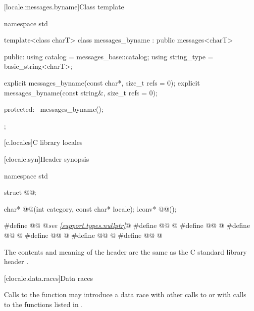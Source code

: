 [locale.messages.byname]{Class template }

%
\begin{codeblock}
namespace std {
  template<class charT>
    class messages_byname : public messages<charT> {
    public:
      using catalog     = messages_base::catalog;
      using string_type = basic_string<charT>;

      explicit messages_byname(const char*, size_t refs = 0);
      explicit messages_byname(const string&, size_t refs = 0);

    protected:
      ~messages_byname();
    };
}
\end{codeblock}

[c.locales]{C library locales}

[clocale.syn]{Header  synopsis}

\begin{codeblock}
namespace std {
  struct @@;

  char* @@(int category, const char* locale);
  lconv* @@();
}

#define @@ @\textit{see \ref{support.types.nullptr}}@
#define @@ @\seebelow@
#define @@ @\seebelow@
#define @@ @\seebelow@
#define @@ @\seebelow@
#define @@ @\seebelow@
#define @@ @\seebelow@
\end{codeblock}

\pnum
The contents and meaning of the header 
are the same as the C standard library header .

[clocale.data.races]{Data races}

\pnum
Calls to the function 
may introduce a data race
with other calls to  or
with calls to the functions listed in .


